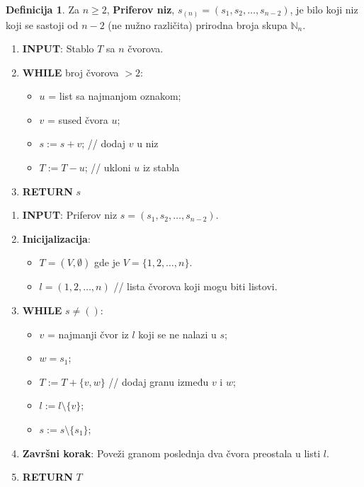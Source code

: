 \documentclass[a4paper,12pt]{article}
\numberwithin{algorithm}{section}
\theoremstyle{plain}
\theoremstyle{definition}
\newtheorem{definition}{Definicija}[section]
\theoremstyle{remark}
\begin{document}
\begin{definition}
    Za $n \geq 2$, \textbf{Priferov niz}, $s_{(n)} = (s_1, s_2, \ldots, s_{n-2})$, je bilo koji niz koji se sastoji od $n-2$ (ne nužno različita) prirodna broja skupa $\mathbb{N}_n$.
\end{definition}

\begin{algorithm}[!h]
    \caption{Priferovo kodiranje}
    \begin{enumerate}
        \item \textbf{INPUT}: Stablo $T$ sa $n$ čvorova.
        \item \textbf{WHILE} broj čvorova $> 2$:
        \begin{itemize}
            \item $u$ = list sa najmanjom oznakom;
            \item $v$ = sused čvora $u$;
            \item $s := s + v$; // dodaj $v$ u niz
            \item $T := T - u$; // ukloni $u$ iz stabla
        \end{itemize}
        \item \textbf{RETURN} $s$
    \end{enumerate}
\end{algorithm}
\begin{algorithm}[!h]
    \caption{Priferovo dekodiranje}
    \begin{enumerate}
        \item \textbf{INPUT}: Priferov niz $s = (s_1, s_2, \ldots, s_{n-2})$.
        \item \textbf{Inicijalizacija}:
        \begin{itemize}
            \item $T = (V, \emptyset)$ gde je $V = \{1, 2, \ldots, n\}$.
            \item $l = (1, 2, \ldots, n)$ // lista čvorova koji mogu biti listovi.
        \end{itemize}
        \item \textbf{WHILE} $s \neq ()$:
        \begin{itemize}
            \item $v$ = najmanji čvor iz $l$ koji se ne nalazi u $s$;
            \item $w = s_1$;
            \item $T := T + \{v, w\}$ // dodaj granu između $v$ i $w$;
            \item $l := l \setminus \{v\}$;
            \item $s := s \setminus \{s_1\}$;
        \end{itemize}
        \item \textbf{Završni korak}: Poveži granom poslednja dva čvora preostala u listi $l$.
        \item \textbf{RETURN} $T$
    \end{enumerate}
\end{algorithm}
\end{document}
